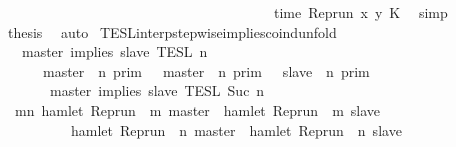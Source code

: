 \begin{isabellebody}
\ \ \ \ \ \ \ \ \ \ \ \ \ \ \ \ \ \ \ \ \ \ \ \ \ \ \ \ \ \ \ \ \ \ \ \ \ \ \ time\ {\isacharparenleft}{\isacharparenleft}Rep{\isacharunderscore}run\ x{\isacharparenright}\ y\ K\ \isamarkupfalse%
\ simp\isanewline
\ \ \isamarkupfalse%
\ {\isacharquery}thesis\ \isamarkupfalse%
\ auto\isanewline
{}\isamarkupfalse%
%
\endisatagproof
{\isafoldproof}%
%
\isadelimproof
\isanewline
%
\endisadelimproof
\isanewline
{}\isamarkupfalse%
\ TESL{\isacharunderscore}interp{\isacharunderscore}stepwise{\isacharunderscore}implies{\isacharunderscore}coind{\isacharunderscore}unfold{\isacharcolon}\isanewline
\ \ {\isacartoucheopen}{\isasymlbrakk}\ master\ implies\ slave\ {\isasymrbrakk}\isactrlsub T\isactrlsub E\isactrlsub S\isactrlsub L\isactrlbsup {\isasymge}\ n\isactrlesup \ {\isacharequal}\isanewline
\ \ \ \ \ {\isacharparenleft}{\isasymlbrakk}\ master\ {\isasymnot}{\isasymUp}\ n\ {\isasymrbrakk}\isactrlsub p\isactrlsub r\isactrlsub i\isactrlsub m\ {\isasymunion}\ {\isasymlbrakk}\ master\ {\isasymUp}\ n\ {\isasymrbrakk}\isactrlsub p\isactrlsub r\isactrlsub i\isactrlsub m\ {\isasyminter}\ {\isasymlbrakk}\ slave\ {\isasymUp}\ n\ {\isasymrbrakk}\isactrlsub p\isactrlsub r\isactrlsub i\isactrlsub m{\isacharparenright}\isanewline
\ \ \ \ \ {\isasyminter}\ {\isasymlbrakk}\ master\ implies\ slave\ {\isasymrbrakk}\isactrlsub T\isactrlsub E\isactrlsub S\isactrlsub L\isactrlbsup {\isasymge}\ Suc\ n\isactrlesup {\isacartoucheclose}\isanewline
%
\isadelimproof
%
\endisadelimproof
%
\isatagproof
{}\isamarkupfalse%
\ {\isacharminus}\isanewline
\ \ \isamarkupfalse%
\ {\isacartoucheopen}{\isacharbraceleft}{\isasymrho}{\isachardot}\ {\isasymforall}m{\isasymge}n{\isachardot}\ hamlet\ {\isacharparenleft}{\isacharparenleft}Rep{\isacharunderscore}run\ {\isasymrho}{\isacharparenright}\ m\ master{\isacharparenright}\ {\isasymlongrightarrow}\ hamlet\ {\isacharparenleft}{\isacharparenleft}Rep{\isacharunderscore}run\ {\isasymrho}{\isacharparenright}\ m\ slave{\isacharparenright}{\isacharbraceright}\isanewline
\ \ \ \ \ \ \ \ {\isacharequal}\ {\isacharbraceleft}{\isasymrho}{\isachardot}\ hamlet\ {\isacharparenleft}{\isacharparenleft}Rep{\isacharunderscore}run\ {\isasymrho}{\isacharparenright}\ n\ master{\isacharparenright}\ {\isasymlongrightarrow}\ hamlet\ {\isacharparenleft}{\isacharparenleft}Rep{\isacharunderscore}run\ {\isasymrho}{\isacharparenright}\ n\ slave{\isacharparenright}{\isacharbraceright}\isanewline

\end{isabellebody}
